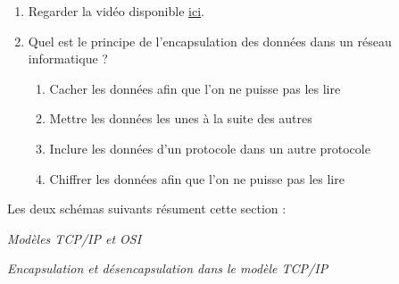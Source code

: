 \documentclass[a4paper,dvipsnames]{article}
\begin{document}
\begin{exercice}{}{}
  \begin{enumerate}
    \item Regarder la vidéo disponible \href{https://www.youtube.com/watch?v=26jazyc7VNk}{ici}.
    \item Quel est le principe de l'encapsulation des données dans un réseau informatique ?
      \begin{enumerate}
	\item Cacher les données afin que l'on ne puisse pas les lire
	\item Mettre les données les unes à la suite des autres
	\item Inclure les données d'un protocole dans un autre protocole
	\item Chiffrer les données afin que l'on ne puisse pas les lire
      \end{enumerate}
  \end{enumerate}
\end{exercice}

\medskip

Les deux schémas suivants résument cette section :

\begin{center}

  \smallskip

  \scriptsize\textit{Modèles TCP/IP et OSI}
\end{center}

\begin{center}

  \smallskip

  \scriptsize\textit{Encapsulation et désencapsulation dans le modèle TCP/IP}
\end{center}
\end{document}
